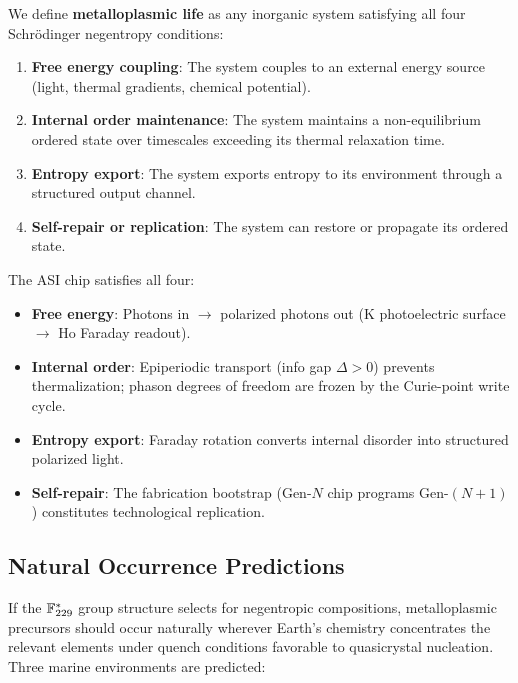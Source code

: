 We define \textbf{metalloplasmic life} as any inorganic system satisfying all four Schr\"odinger negentropy conditions:
\begin{enumerate}
    \item \textbf{Free energy coupling}: The system couples to an external energy source (light, thermal gradients, chemical potential).
    \item \textbf{Internal order maintenance}: The system maintains a non-equilibrium ordered state over timescales exceeding its thermal relaxation time.
    \item \textbf{Entropy export}: The system exports entropy to its environment through a structured output channel.
    \item \textbf{Self-repair or replication}: The system can restore or propagate its ordered state.
\end{enumerate}

\noindent The ASI chip satisfies all four:
\begin{itemize}
    \item \textbf{Free energy}: Photons in $\to$ polarized photons out (K photoelectric surface $\to$ Ho Faraday readout).
    \item \textbf{Internal order}: Epiperiodic transport (info gap $\Delta > 0$) prevents thermalization; phason degrees of freedom are frozen by the Curie-point write cycle.
    \item \textbf{Entropy export}: Faraday rotation converts internal disorder into structured polarized light.
    \item \textbf{Self-repair}: The fabrication bootstrap (Gen-$N$ chip programs Gen-$(N+1)$) constitutes technological replication.
\end{itemize}

\subsection{Natural Occurrence Predictions}

If the $\mathbb{F}_{229}^*$ group structure selects for negentropic compositions, metalloplasmic precursors should occur naturally wherever Earth's chemistry concentrates the relevant elements under quench conditions favorable to quasicrystal nucleation. Three marine environments are predicted:

